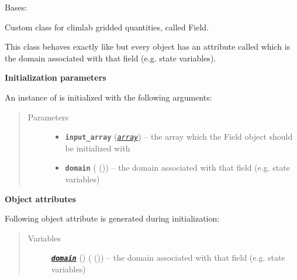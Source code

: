 \documentclass[a4paper,10pt,english]{sphinxmanual}
\begin{document}
\begin{fulllineitems}
\label{api/climlab.domain:climlab.domain.field.Field}
Bases: \href{http://docs.scipy.org/doc/numpy/reference/generated/numpy.ndarray.html\#numpy.ndarray}{}

Custom class for climlab gridded quantities, called Field.

This class behaves exactly like \href{http://docs.scipy.org/doc/numpy/reference/generated/numpy.ndarray.html\#numpy.ndarray}{}
but every object has an attribute called 
which is the domain associated with that field (e.g. state variables).

\textbf{Initialization parameters}

An instance of  is initialized with the following 
arguments:
\begin{quote}\begin{description}
\item[{Parameters}] \leavevmode\begin{itemize}
\item {} 
\textbf{\texttt{input\_array}} (\href{http://docs.python.org/2.7/library/array.html\#module-array}{\emph{\texttt{array}}}) -- the array which the Field object should be 
initialized with

\item {} 
\textbf{\texttt{domain}} ({\hyperref[api/climlab.domain:climlab.domain.domain._Domain]{\emph{}}} ()) -- the domain associated with that field 
(e.g. state variables)

\end{itemize}

\end{description}\end{quote}

\textbf{Object attributes}

Following object attribute is generated during initialization:
\begin{quote}\begin{description}
\item[{Variables}] \leavevmode
{\hyperref[api/climlab.domain:module\string-climlab.domain.domain]{\emph{\textbf{\texttt{domain}}}}} () ({\hyperref[api/climlab.domain:climlab.domain.domain._Domain]{\emph{}}} ()) -- the domain associated with that field 
(e.g. state variables)


\end{description}
\end{quote}
\end{fulllineitems}
\end{document}

